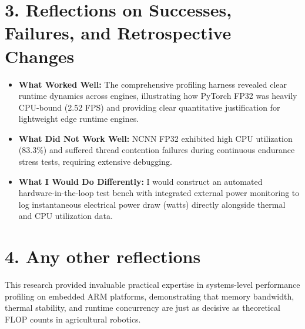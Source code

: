 \documentclass[11pt, a4paper]{article}
\begin{document}
\section*{3. Reflections on Successes, Failures, and Retrospective Changes}
\begin{itemize}
    \item \textbf{What Worked Well:} The comprehensive profiling harness revealed clear runtime dynamics across engines, illustrating how PyTorch FP32 was heavily CPU-bound (2.52 FPS) and providing clear quantitative justification for lightweight edge runtime engines.
    \item \textbf{What Did Not Work Well:} NCNN FP32 exhibited high CPU utilization (83.3\%) and suffered thread contention failures during continuous endurance stress tests, requiring extensive debugging.
    \item \textbf{What I Would Do Differently:} I would construct an automated hardware-in-the-loop test bench with integrated external power monitoring to log instantaneous electrical power draw (watts) directly alongside thermal and CPU utilization data.
\end{itemize}

\section*{4. Any other reflections}
This research provided invaluable practical expertise in systems-level performance profiling on embedded ARM platforms, demonstrating that memory bandwidth, thermal stability, and runtime concurrency are just as decisive as theoretical FLOP counts in agricultural robotics.
\end{document}
